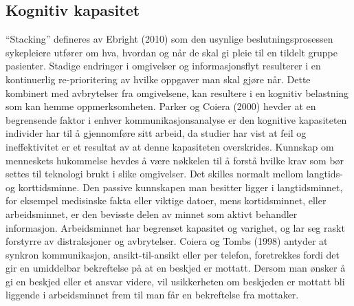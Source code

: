 \subsection{Kognitiv kapasitet}
“Stacking” defineres av Ebright (2010) som den usynlige beslutningsprosessen sykepleiere utfører om hva, hvordan og når de skal gi pleie til en tildelt gruppe pasienter. Stadige endringer i omgivelser og informasjonsflyt resulterer i en kontinuerlig re-prioritering av hvilke oppgaver man skal gjøre når. Dette kombinert med avbrytelser fra omgivelsene, kan resultere i en kognitiv belastning som kan hemme oppmerksomheten. Parker og Coiera (2000) hevder at en begrensende faktor i enhver kommunikasjonsanalyse er den kognitive kapasiteten individer har til å gjennomføre sitt arbeid, da studier har vist at feil og ineffektivitet er et resultat av at denne kapasiteten overskrides. Kunnskap om menneskets hukommelse hevdes å være nøkkelen til å forstå hvilke krav som bør settes til teknologi brukt i slike omgivelser. Det skilles normalt mellom langtids- og korttidsminne. Den passive kunnskapen man besitter ligger i langtidsminnet, for eksempel medisinske fakta eller viktige datoer, mens kortidsminnet, eller arbeidsminnet, er den bevisste delen av minnet som aktivt behandler informasjon. Arbeidsminnet har begrenset kapasitet og varighet, og lar seg raskt forstyrre av distraksjoner og avbrytelser. Coiera og Tombs (1998) \nocite{Coiera98} antyder at synkron kommunikasjon, ansikt-til-ansikt eller per telefon, foretrekkes fordi det gir en umiddelbar bekreftelse på at en beskjed er mottatt. Dersom man ønsker å gi en beskjed eller et ansvar videre, vil usikkerheten om beskjeden er mottatt bli liggende i arbeidsminnet frem til man får en bekreftelse fra mottaker. 




